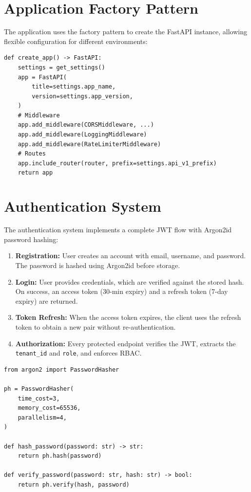 \documentclass[12pt, a4paper]{report}
\begin{document}
\section{Application Factory Pattern}

The application uses the factory pattern to create the FastAPI instance, allowing flexible configuration for different environments:

\begin{lstlisting}[language=Python3, caption={Application Factory (main.py)}]
def create_app() -> FastAPI:
    settings = get_settings()
    app = FastAPI(
        title=settings.app_name,
        version=settings.app_version,
    )
    # Middleware
    app.add_middleware(CORSMiddleware, ...)
    app.add_middleware(LoggingMiddleware)
    app.add_middleware(RateLimiterMiddleware)
    # Routes
    app.include_router(router, prefix=settings.api_v1_prefix)
    return app
\end{lstlisting}

\section{Authentication System}

The authentication system implements a complete JWT flow with Argon2id password hashing:

\begin{enumerate}
    \item \textbf{Registration:} User creates an account with email, username, and password. The password is hashed using Argon2id before storage.
    \item \textbf{Login:} User provides credentials, which are verified against the stored hash. On success, an access token (30-min expiry) and a refresh token (7-day expiry) are returned.
    \item \textbf{Token Refresh:} When the access token expires, the client uses the refresh token to obtain a new pair without re-authentication.
    \item \textbf{Authorization:} Every protected endpoint verifies the JWT, extracts the \texttt{tenant\_id} and \texttt{role}, and enforces RBAC.
\end{enumerate}

\begin{lstlisting}[language=Python3, caption={Password Hashing with Argon2id}]
from argon2 import PasswordHasher

ph = PasswordHasher(
    time_cost=3,
    memory_cost=65536,
    parallelism=4,
)

def hash_password(password: str) -> str:
    return ph.hash(password)

def verify_password(password: str, hash: str) -> bool:
    return ph.verify(hash, password)
\end{lstlisting}
\end{document}
